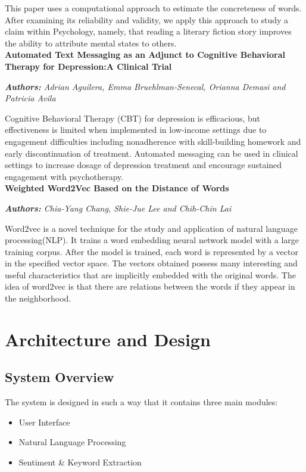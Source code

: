 \documentclass[conference,compsoc]{IEEEtran}
\begin{document}
This paper uses a computational approach to estimate the concreteness of words. After examining its reliability and validity, we apply this approach to study a claim within Psychology, namely, that reading a literary fiction story improves the ability to attribute mental states to others.\\

\noindent
\textbf{Automated Text Messaging as an Adjunct to Cognitive Behavioral Therapy for Depression:A Clinical Trial}

\noindent
\textit{\textbf{Authors:} Adrian Aguilera, Emma Bruehlman-Senecal, Orianna Demasi and Patricia Avila}

Cognitive Behavioral Therapy (CBT) for depression is efficacious, but effectiveness is limited when implemented in low-income settings due to engagement difficulties including nonadherence with skill-building homework and early discontinuation of treatment. Automated messaging can be used in clinical settings to increase dosage of depression treatment and encourage sustained engagement with psychotherapy.\\

\noindent
\textbf{Weighted Word2Vec Based on the Distance of Words}

\noindent
\textit{\textbf{Authors:} Chia-Yang Chang, Shie-Jue Lee and Chih-Chin Lai}

Word2vec is a novel technique for the study and application of natural language processing(NLP). It trains a word embedding neural network model with a large training corpus. After the model is trained, each word is represented by a vector in the specified vector space. The vectors obtained possess many interesting and useful characteristics that are implicitly embedded with the original words. The idea of word2vec is that there are relations between the words if they appear in the neighborhood.\\


\section{Architecture and Design}

\subsection{System Overview}

The system is designed in such a way that it contains three main modules:
\begin{itemize}
    \item User Interface
    \item Natural Language Processing
    \item Sentiment \& Keyword Extraction
\end{itemize}
\end{document}
